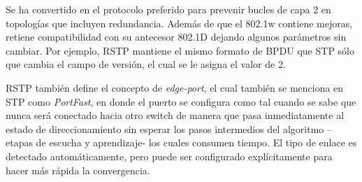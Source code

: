 Se ha convertido en el protocolo preferido para prevenir bucles de capa 2 en topologías que incluyen redundancia. Además de que el 802.1w contiene mejoras, retiene compatibilidad con su antecesor 802.1D dejando algunos parámetros sin cambiar. Por ejemplo, RSTP mantiene el mismo formato de BPDU que STP sólo que cambia el campo de versión, el cual se le asigna el valor de 2.

RSTP también define el concepto de \textit{edge-port}, el cual también se menciona en STP como \textit{PortFast}, en donde el puerto se configura como tal cuando se sabe que nunca será conectado hacia otro switch de manera que pasa inmediatamente al estado de direccionamiento sin esperar los pasos intermedios del algoritmo –etapas de escucha y aprendizaje- los cuales consumen tiempo. El tipo de enlace es detectado automáticamente, pero puede ser configurado explícitamente para hacer más rápida la convergencia.
